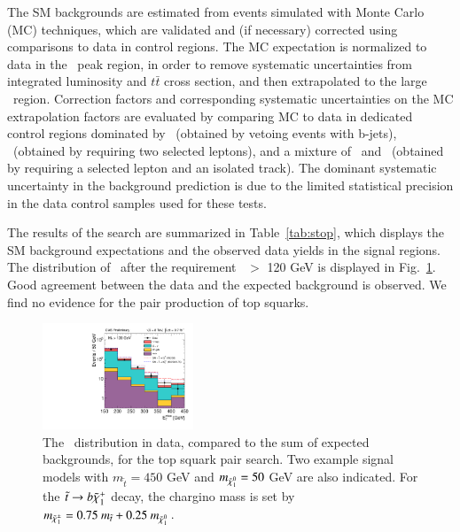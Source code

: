 The SM backgrounds are estimated from events simulated with Monte Carlo (MC) techniques, which are validated and 
(if necessary) corrected using comparisons to data in control regions. The MC expectation is normalized to data in the \mt\ peak region,
in order to remove systematic uncertainties from integrated luminosity and $t\bar{t}$ cross section, and then extrapolated to the 
large \mt\ region. Correction factors and corresponding systematic uncertainties on the MC extrapolation factors are evaluated by 
comparing MC to data in dedicated control regions dominated by \wjets\ (obtained by vetoing events with b-jets), \ttll\ 
(obtained by requiring two selected leptons), and a mixture of \ttll\ and \ttljets\ (obtained by requiring a selected lepton and 
an isolated track). The dominant systematic uncertainty in the background prediction is due to the limited statistical precision in
the data control samples used for these tests.




The results of the search are summarized in Table~\ref{tab:stop}, which displays the SM background expectations and the observed data yields
in the signal regions. The distribution of \met\ after the requirement \mt\ $>$ 120 GeV is displayed in Fig.~\ref{fig:stop}. 
Good agreement between the data and the expected background is observed. We find no evidence
for the pair production of top squarks.

\begin{figure}
\centering
\includegraphics[width=0.4\textwidth]{HCPPlots/stopmet.pdf}
\caption{The \met\ distribution in data, compared to the sum of expected backgrounds, for the top squark pair search.
Two example signal models with $m_{\tilde{t}}=450$ GeV and $m_{\tilde{\chi}_{1}^{0}}=50$ GeV are also indicated. For the $\tilde{t}\to b\tilde{\chi}_{1}^{+}$
decay, the chargino mass is set by $m_{\tilde{\chi}_{1}^{\pm}}=0.75~m_{\tilde{t}}+0.25~m_{\tilde{\chi}_{1}^{0}}$.}
\label{fig:stop}       %
\end{figure}

